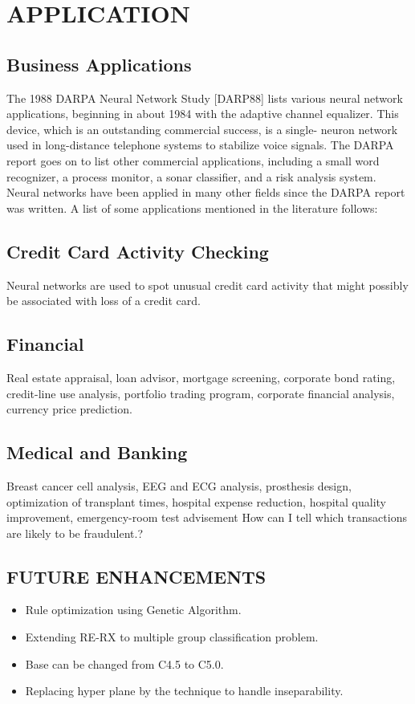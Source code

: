 \documentclass[a4paper,14pt,onecolumn]{article}
\begin{document}
\newpage
\section{APPLICATION}
\subsection{Business Applications}
The 1988 DARPA Neural Network Study [DARP88] lists various neural network applications, beginning in about 1984 with the adaptive channel equalizer. This device, which is an outstanding commercial success, is a single- neuron network used in long-distance telephone systems to stabilize voice signals. The DARPA report goes on to list other commercial applications, including a small word recognizer, a process monitor, a sonar classifier, and a risk analysis system. Neural networks have been applied in many other fields since the DARPA report was written. A list of some applications mentioned in the literature follows:
\subsection{Credit Card Activity Checking}
Neural networks are used to spot unusual credit card activity that might possibly be associated with loss of a credit card. 
\subsection{Financial}
Real estate appraisal, loan advisor, mortgage screening, corporate bond rating, credit-line use analysis, portfolio trading program, corporate financial analysis, currency price prediction. 
\subsection{Medical and Banking}
Breast cancer cell analysis, EEG and ECG analysis, prosthesis design, optimization of transplant times, hospital expense reduction, hospital quality improvement, emergency-room test advisement 
How can I tell which transactions are likely to be fraudulent.?
\subsection{FUTURE ENHANCEMENTS}
  \begin{itemize}
  \item Rule optimization using Genetic Algorithm.
  \item Extending RE-RX to multiple group classification problem.
  \item Base can be changed from C4.5 to C5.0.
  \item Replacing hyper plane by the technique to handle inseparability.
  \end{itemize}
\end{document}

